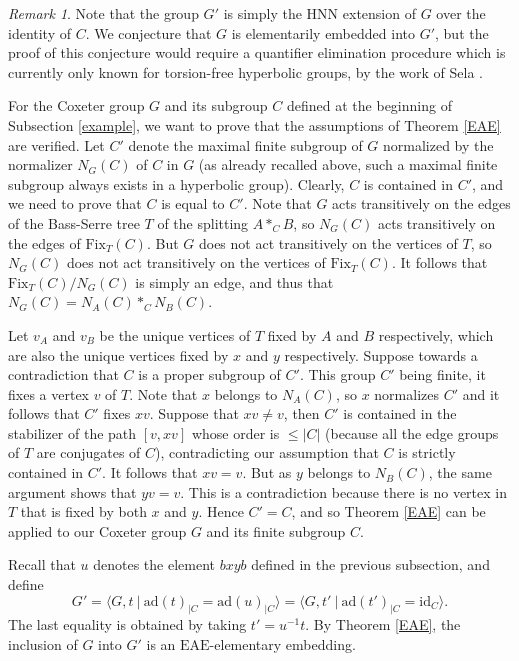 \documentclass[a4paper, 11pt]{amsart}
\theoremstyle{definition}
\theoremstyle{remark}
\newtheorem{rk}[te]{Remark}
\renewcommand{\leq}{\leqslant}
\begin{document}
\begin{rk}
Note that the group $G'$ is simply the HNN extension of $G$ over the identity of $C$. We conjecture that $G$ is elementarily embedded into $G'$, but the proof of this conjecture would require a quantifier elimination procedure which is currently only known for torsion-free hyperbolic groups, by the work of Sela \cite{Sel09}.
\end{rk}

For the Coxeter group $G$ and its subgroup $C$ defined at the beginning of Subsection \ref{example}, we want to prove that the assumptions of Theorem \ref{EAE} are verified. Let $C'$ denote the maximal finite subgroup of $G$ normalized by the normalizer $N_G(C)$ of $C$ in $G$ (as already recalled above, such a maximal finite subgroup always exists in a hyperbolic group). Clearly, $C$ is contained in $C'$, and we need to prove that $C$ is equal to  $C'$. Note that $G$ acts transitively on the edges of the Bass-Serre tree $T$ of the splitting $A\ast_C B$, so $N_G(C)$ acts transitively on the edges of $\mathrm{Fix}_T(C)$. But $G$ does not act transitively on the vertices of $T$, so $N_G(C)$ does not act transitively on the vertices of $\mathrm{Fix}_T(C)$. It follows that $\mathrm{Fix}_T(C)/N_G(C)$ is simply an edge, and thus that $N_G(C)=N_A(C)\ast_C N_B(C)$. 

\smallskip \noindent
Let $v_A$ and $v_B$ be the unique vertices of $T$ fixed by $A$ and $B$ respectively, which are also the unique vertices fixed by $x$ and $y$ respectively. Suppose towards a contradiction that $C$ is a proper subgroup of $C'$. This group $C'$ being finite, it fixes a vertex $v$ of $T$. Note that $x$ belongs to $N_A(C)$, so $x$ normalizes $C'$ and it follows that $C'$ fixes $xv$. Suppose that $xv\neq v$, then $C'$ is contained in the stabilizer of the path $[v,xv]$ whose order is $\leq \vert C\vert$ (because all the edge groups of $T$ are conjugates of $C$), contradicting our assumption that $C$ is strictly contained in $C'$. It follows that $xv=v$. But as $y$ belongs to $N_B(C)$, the same argument shows that $yv=v$. This is a contradiction because there is no vertex in $T$ that is fixed by both $x$ and $y$. Hence $C'=C$, and so Theorem \ref{EAE} can be applied to our Coxeter group $G$ and its finite subgroup $C$.

\smallskip \noindent
Recall that $u$ denotes the element $bxyb$ defined in the previous subsection, and define \[G'= \langle G, t \ \vert \ \mathrm{ad}(t)_{\vert C}=\mathrm{ad}(u)_{\vert C}\rangle=\langle G,t' \ \vert \ \mathrm{ad}(t')_{\vert C}=\mathrm{id}_C\rangle.\] The last equality is obtained by taking $t'=u^{-1}t$. By Theorem \ref{EAE}, the inclusion of $G$ into $G'$ is an $\mathrm{EAE}$-elementary embedding. 
\end{document}

